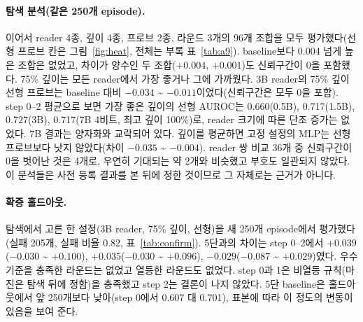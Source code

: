 \documentclass[11pt]{article}
\begin{document}
\paragraph{탐색 분석(같은 250개 episode).} 이어서 reader 4종, 깊이 4종, 프로브 2종, 라운드 3개의 96개 조합을 모두 평가했다(선형 프로브 칸은 그림~\ref{fig:heat}, 전체는 부록 표~\ref{tab:a9}).
baseline보다 0.004 넘게 높은 조합은 없었고, 차이가 양수인 두 조합($+0.004$, $+0.001$)도 신뢰구간이 0을 포함했다.
75\% 깊이는 모든 reader에서 가장 좋거나 그에 가까웠다. 3B reader의 75\% 깊이 선형 프로브는 baseline 대비 $-0.034$ \textasciitilde{} $-0.011$이었다(신뢰구간은 모두 0을 포함).
step 0--2 평균으로 보면 가장 좋은 깊이의 선형 AUROC는 0.660(0.5B), 0.717(1.5B), 0.727(3B), 0.717(7B 4비트, 최고 깊이 100\%)로,
reader 크기에 따른 단조 증가는 없었다. 7B 결과는 양자화와 교락되어 있다. 깊이를 평균하면 고정 설정의 MLP는 선형 프로브보다 낫지 않았다(차이 $-0.035$ \textasciitilde{} $-0.004$).
reader 쌍 비교 36개 중 신뢰구간이 0을 벗어난 것은 4개로, 우연히 기대되는 약 2개와 비슷했고 부호도 일관되지 않았다.
이 분석들은 사전 등록 결과를 본 뒤에 정한 것이므로 그 자체로는 근거가 아니다.

\paragraph{확증 홀드아웃.} 탐색에서 고른 한 설정(3B reader, 75\% 깊이, 선형)을 새 250개 episode에서 평가했다(실패 205개, 실패 비율 0.82, 표~\ref{tab:confirm}).
5단과의 차이는 step 0--2에서 $+0.039$($-0.030$ \textasciitilde{} $+0.100$), $+0.035$($-0.030$ \textasciitilde{} $+0.096$), $-0.029$($-0.087$ \textasciitilde{} $+0.029$)였다.
우수 기준을 충족한 라운드는 없었고 열등한 라운드도 없었다. step 0과 1은 비열등 규칙(마진은 탐색 뒤에 정함)을 충족했고 step 2는 결론이 나지 않았다.
5단 baseline은 홀드아웃에서 앞 250개보다 낮아(step 0에서 0.607 대 0.701), 표본에 따라 이 정도의 변동이 있음을 보여 준다.
\end{document}
